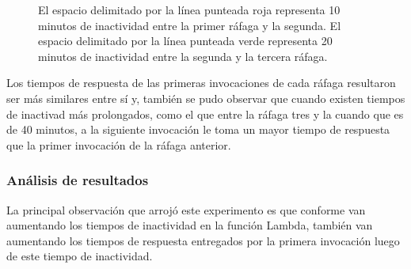 \begin{figure}
\hspace{-1.5cm}
\caption{El espacio delimitado por la línea punteada roja representa 10 minutos de inactividad entre la primer ráfaga y la segunda. El espacio delimitado por la línea punteada verde representa 20 minutos de inactividad entre la segunda y la tercera ráfaga.}
\label{fig:rafagas-hasta-2mb}
\end{figure}

Los tiempos de respuesta de las primeras invocaciones de cada ráfaga resultaron ser más similares entre sí y, también se pudo observar que cuando existen tiempos de inactivad más prolongados, como el que entre la ráfaga tres y la cuando que es de 40 minutos, a la siguiente invocación le toma un mayor tiempo de respuesta que la primer invocación de la ráfaga anterior.

\subsubsection{Análisis de resultados}
La principal observación que arrojó este experimento es que conforme van aumentando los tiempos de inactividad en la función Lambda, también van aumentando los tiempos de respuesta entregados por la primera invocación luego de este tiempo de inactividad. 

